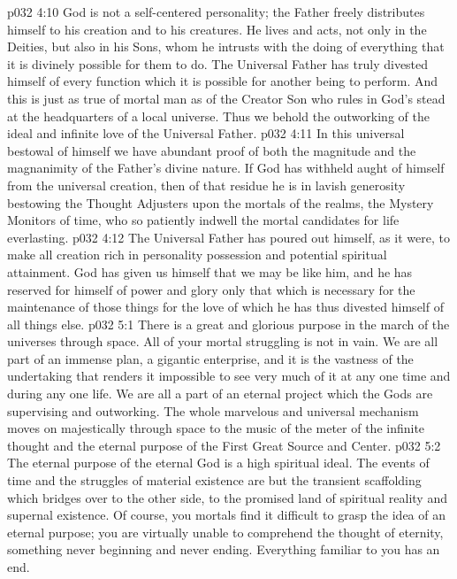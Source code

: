 \pc \vs p032 4:10 God is not a self\hyp{}centered personality; the Father freely distributes himself to his creation and to his creatures. He lives and acts, not only in the Deities, but also in his Sons, whom he intrusts with the doing of everything that it is divinely possible for them to do. The Universal Father has truly divested himself of every function which it is possible for another being to perform. And this is just as true of mortal man as of the Creator Son who rules in God’s stead at the headquarters of a local universe. Thus we behold the outworking of the ideal and infinite love of the Universal Father.
\vs p032 4:11 In this universal bestowal of himself we have abundant proof of both the magnitude and the magnanimity of the Father’s divine nature. If God has withheld aught of himself from the universal creation, then of that residue he is in lavish generosity bestowing the Thought Adjusters upon the mortals of the realms, the Mystery Monitors of time, who so patiently indwell the mortal candidates for life everlasting.
\vs p032 4:12 The Universal Father has poured out himself, as it were, to make all creation rich in personality possession and potential spiritual attainment. God has given us himself that we may be like him, and he has reserved for himself of power and glory only that which is necessary for the maintenance of those things for the love of which he has thus divested himself of all things else.
\vs p032 5:1 There is a great and glorious purpose in the march of the universes through space. All of your mortal struggling is not in vain. We are all part of an immense plan, a gigantic enterprise, and it is the vastness of the undertaking that renders it impossible to see very much of it at any one time and during any one life. We are all a part of an eternal project which the Gods are supervising and outworking. The whole marvelous and universal mechanism moves on majestically through space to the music of the meter of the infinite thought and the eternal purpose of the First Great Source and Center.
\vs p032 5:2 The eternal purpose of the eternal God is a high spiritual ideal. The events of time and the struggles of material existence are but the transient scaffolding which bridges over to the other side, to the promised land of spiritual reality and supernal existence. Of course, you mortals find it difficult to grasp the idea of an eternal purpose; you are virtually unable to comprehend the thought of eternity, something never beginning and never ending. Everything familiar to you has an end.
